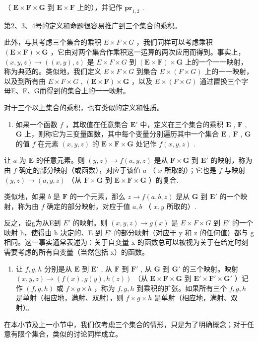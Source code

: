 （ \(\mathbf{E} \times \mathbf{F} \times \mathbf{G}\) 到 \(\mathbf{E} \times \mathbf{F}\) 上的），并记作 \(\mathbf{pr}_{1,2}\) .

第2、3、4号的定义和命题很容易推广到三个集合的乘积。

此外，与其考虑三个集合的乘积 \(E \times F \times G\) ，我们同样可以考虑乘积 \((\mathbf{E} \times \mathbf{F}) \times \mathbf{G}\) ，它由对两个集合作乘积这一运算的两次应用而得到。事实上， \((x, y, z) \to ((x, y), z)\) 是 \(E \times F \times G\) 到 \((\mathbf{E} \times \mathbf{F}) \times \mathbf{G}\) 上的一个一一映射，称为典范的。类似地，我们定义 \(E \times F \times G\) 到集合 \(E \times (F \times G)\) 上的一一映射，以及到所有由 \(E \times F \times G\) , \((\mathbf{E} \times \mathbf{F}) \times \mathbf{G}\) ，以及 \(E \times (F \times G)\) 通过置换三个字母E、F、G而得到的集合上的一一映射。

对于三个以上集合的乘积，也有类似的定义和性质。

\begin{enumerate}
\def\labelenumi{\arabic{enumi}.}
\setcounter{enumi}{12}
\tightlist
\item
  如果一个函数 \(f\) ，其取值在任意集合 \(\mathbf{E}'\) 中，定义在三个集合的乘积 \(\mathbf{E}\) , \(\mathbf{F}\) , \(\mathbf{G}\) 上，则称它为三变量函数，其中每个变量分别遍历其中一个集合 \(\mathbf{E}\) , \(\mathbf{F}\) , \(\mathbf{G}\) 的值 \(f\) 在元素 \((x, y, z)\) 的 \(\mathbf{E} \times \mathbf{F} \times \mathbf{G}\) 处记作 \(f(x, y, z)\) .
\end{enumerate}

让 \(a\) 为 \(\mathbf{E}\) 的任意元素。则 \((y, z) \to f(a, y, z)\) 是从 \(\mathbf{F} \times \mathbf{G}\) 到 \(\mathbf{E}'\) 的映射，称为由 \(f\) 确定的部分映射（或函数），对应于该值 \(a\) （ \(x\) 所取的）；它也是 \(f\) 与映射 \((y, z) \to (a, y, z)\) （从 \(\mathbf{F} \times \mathbf{G}\) 到 \(\mathbf{E} \times \mathbf{F} \times \mathbf{G}\) ）的复合.

类似地，如果 \(b\) 是 \(\mathbf{F}\) 的一个元素，那么 \(z \to f(a, b, z)\) 是从 \(\mathbf{G}\) 到 \(\mathbf{E}'\) 的一个映射，称为由 \(f\) 确定的部分映射，对应于值 \(a, b\) （ \(x, y\) 所取的）.

反之，设g为从E到 \(E'\) 的映射。则 \((x, y, z) \to g(x)\) 是 \(E \times F \times G\) 到 \(E'\) 的一个映射 h，使得由 h 决定的、E 到 \(E'\) 的部分映射（对应于 y 和 z 的任何值）都与 g 相同。这一事实通常表述为：关于自变量 x 的函数总可以被视为关于在给定时刻需要考虑的所有自变量（当然包括 x）的函数。

\begin{enumerate}
\def\labelenumi{\arabic{enumi}.}
\setcounter{enumi}{13}
\tightlist
\item
  让 \(f, g, h\) 分别是从 \(\mathbf{E}\) 到 \(\mathbf{E}'\) , 从 \(\mathbf{F}\) 到 \(\mathbf{F}'\) , 从 \(\mathbf{G}\) 到 \(\mathbf{G}'\) 的三个映射。映射 \((x, y, z) \to (f(x), g(y), h(z))\) （从 \(\mathbf{E} \times \mathbf{F} \times \mathbf{G}\) 到 \(\mathbf{E}' \times \mathbf{F}' \times \mathbf{G}'\) ）记作 \((f, g, h)\) 或 \(f \times g \times h\) ，称为 \(f, g, h\) 到乘积的扩张。如果所有三个 \(f, g, h\) 是单射（相应地，满射、双射），则 \(f \times g \times h\) 是单射（相应地，满射、双射）。
\end{enumerate}

在本小节及上一小节中，我们仅考虑三个集合的情形，只是为了明确概念；对于任意有限个集合，类似的讨论同样成立。

